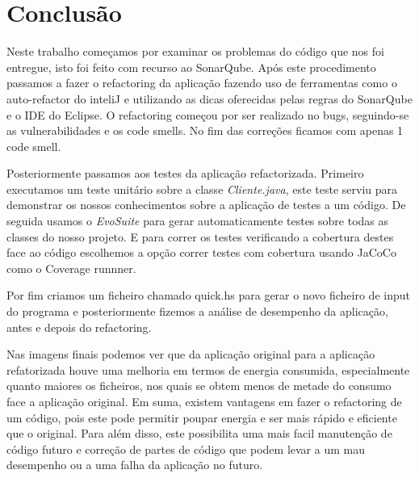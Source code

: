 \vspace{1cm}
\section{Conclusão}
\hfill\newline
\par Neste trabalho começamos por examinar os problemas do código que nos foi entregue, isto foi feito com recurso ao SonarQube. Após este procedimento passamos a fazer o refactoring da aplicação fazendo uso de ferramentas como o auto-refactor do inteliJ e utilizando as dicas oferecidas pelas regras do SonarQube e o IDE do Eclipse. O refactoring começou por ser realizado no bugs, seguindo-se as vulnerabilidades e os code smells. No fim das correções ficamos com apenas 1 code smell. \newline
\par Posteriormente passamos aos testes da aplicação refactorizada. Primeiro executamos um teste unitário sobre a classe \textit{Cliente.java}, este teste serviu para demonstrar os nossos conhecimentos sobre a aplicação de testes a um código. De seguida usamos o \textit{EvoSuite} para gerar automaticamente testes sobre todas as classes do nosso projeto. E para correr os testes verificando a cobertura destes face ao código escolhemos a opção correr testes com cobertura usando JaCoCo como o Coverage runnner.\newline
\par Por fim criamos um ficheiro chamado quick.hs para gerar o novo ficheiro de input do programa e posteriormente fizemos a análise de desempenho da aplicação, antes e depois do refactoring.\newline
\par Nas imagens finais podemos ver que da aplicação original para a aplicação refatorizada houve uma melhoria em termos de energia consumida, especialmente quanto maiores os ficheiros, nos quais se obtem menos de metade do consumo face a aplicação original.\newline
Em suma, existem vantagens em fazer o refactoring de um código, pois este pode permitir poupar energia e ser mais rápido e eficiente que o original. Para além disso, este possibilita uma mais facil manutenção de código futuro e correção de partes de código que podem levar a um mau desempenho ou a uma falha da aplicação no futuro.

